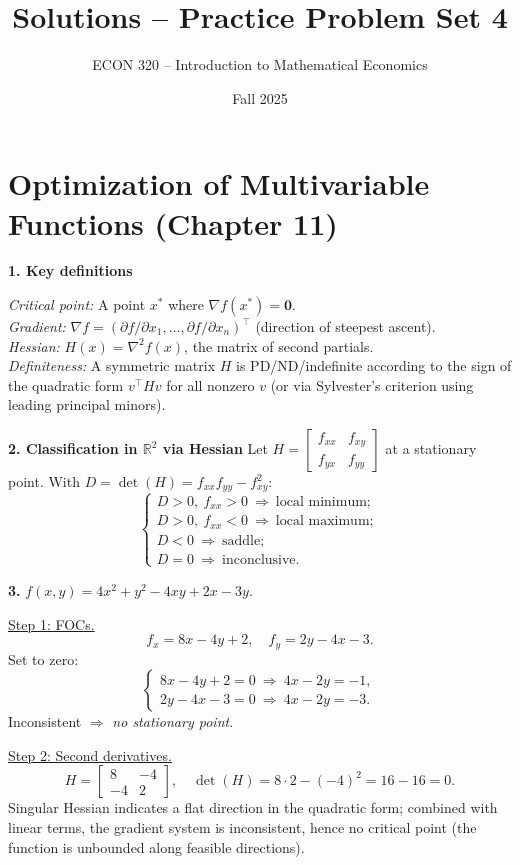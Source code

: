 \documentclass[12pt]{article}
\title{Solutions -- Practice Problem Set 4}
\author{ECON 320 -- Introduction to Mathematical Economics}
\date{Fall 2025}
\begin{document}
\maketitle

\section*{Optimization of Multivariable Functions (Chapter 11)}

\textbf{1. Key definitions}

\textit{Critical point:} A point $x^\ast$ where $\nabla f(x^\ast)=\mathbf{0}$. \\
\textit{Gradient:} $\nabla f=(\partial f/\partial x_1,\ldots,\partial f/\partial x_n)^\top$ (direction of steepest ascent). \\
\textit{Hessian:} $H(x)=\nabla^2 f(x)$, the matrix of second partials. \\
\textit{Definiteness:} A symmetric matrix $H$ is PD/ND/indefinite according to the sign of the quadratic form $v^\top H v$ for all nonzero $v$ (or via Sylvester’s criterion using leading principal minors).

\medskip

\textbf{2. Classification in $\mathbb{R}^2$ via Hessian}
Let $H=\begin{bmatrix}f_{xx}&f_{xy}\\ f_{yx}&f_{yy}\end{bmatrix}$ at a stationary point.
With $D=\det(H)=f_{xx}f_{yy}-f_{xy}^2$:
\[
\begin{cases}
D>0,\ f_{xx}>0 \ \Rightarrow\ \text{local minimum};\\
D>0,\ f_{xx}<0 \ \Rightarrow\ \text{local maximum};\\
D<0 \ \Rightarrow\ \text{saddle};\\
D=0 \ \Rightarrow\ \text{inconclusive}.
\end{cases}
\]

\medskip

\textbf{3.} $f(x,y)=4x^2+y^2-4xy+2x-3y$.

\underline{Step 1: FOCs.} 
\[
f_x=8x-4y+2,\quad f_y=2y-4x-3.
\]
Set to zero:
\[
\begin{cases}
8x-4y+2=0 \ \Rightarrow\ 4x-2y=-1,\\
2y-4x-3=0 \ \Rightarrow\ 4x-2y=-3.
\end{cases}
\]
Inconsistent $\Rightarrow$ \emph{no stationary point}.

\underline{Step 2: Second derivatives.}
\[
H=\begin{bmatrix}8&-4\\-4&2\end{bmatrix},\quad \det(H)=8\cdot 2-(-4)^2=16-16=0.
\]
Singular Hessian indicates a flat direction in the quadratic form; combined with linear terms, the gradient system is inconsistent, hence no critical point (the function is unbounded along feasible directions).
\end{document}
